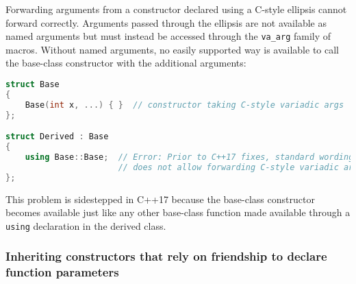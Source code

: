 Forwarding arguments from a constructor declared using a C-style ellipsis cannot forward correctly. Arguments passed through the ellipsis are not available as named arguments but must instead be accessed through the \texttt{va\_arg} family of macros. Without named arguments, no easily supported way is available to call the base-class constructor with the additional arguments:
\begin{lstlisting}[language=C++]
struct Base
{
    Base(int x, ...) { }  // constructor taking C-style variadic args
};

struct Derived : Base
{
    using Base::Base;  // Error: Prior to C++17 fixes, standard wording
                       // does not allow forwarding C-style variadic args.
};
\end{lstlisting}
    This problem is sidestepped in C++17 because the base-class constructor becomes available just like any other base-class function made available through a \texttt{using} declaration in the derived class.

\subsubsection[Inheriting constructors that rely on friendship to declare function parameters]{Inheriting constructors that rely on friendship to declare\\ function parameters}

